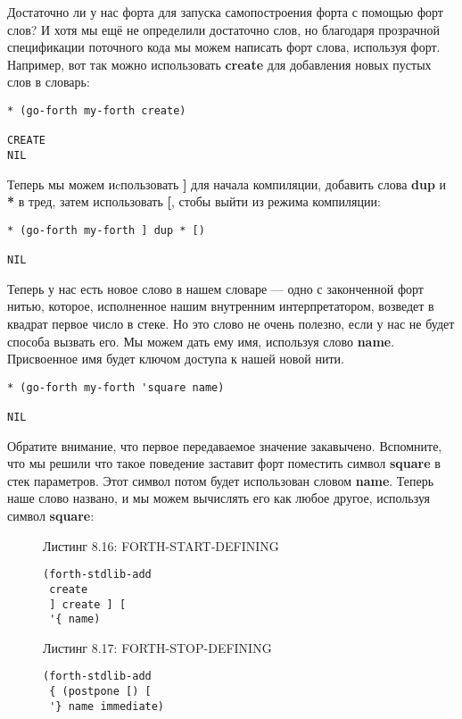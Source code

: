 Достаточно ли у нас форта для запуска самопостроения форта с помощью форт слов? И хотя мы ещё не определили достаточно слов, но благодаря прозрачной спецификации поточного кода мы можем написать форт слова, используя форт. Например, вот так можно использовать \textbf{create} для добавления новых пустых слов в словарь:

\begin{verbatim}
* (go-forth my-forth create)

CREATE 
NIL
\end{verbatim}

Теперь мы можем иcпользовать \textbf{]} для начала компиляции, добавить слова \textbf{dup} и \textbf{*} в тред, затем использовать \textbf{[}, стобы выйти из режима компиляции:

\begin{verbatim}
* (go-forth my-forth ] dup * [)

NIL
\end{verbatim}

Теперь у нас есть новое слово в нашем словаре --- одно с законченной форт нитью, которое, исполненное нашим внутренним интерпретатором, возведет в квадрат первое число в стеке. Но это слово не очень полезно, если у нас не будет способа вызвать его. Мы можем дать ему имя, используя слово \textbf{name}. Присвоенное имя будет ключом доступа к нашей новой нити.

\begin{verbatim}
* (go-forth my-forth 'square name)

NIL
\end{verbatim}

Обратите внимание, что первое передаваемое значение закавычено. Вспомните, что мы решили что такое поведение заставит форт поместить символ \textbf{square} в стек параметров. Этот символ потом будет использован словом \textbf{name}. Теперь наше слово названо, и мы можем вычислять его как любое другое, используя символ \textbf{square}: 

\begin{figure}Листинг 8.16: FORTH-START-DEFINING\label{listing_8.16}
\listbegin
\begin{verbatim}
(forth-stdlib-add
 create
 ] create ] [
 '{ name)
\end{verbatim}
\listend
\end{figure}

\begin{figure}Листинг 8.17: FORTH-STOP-DEFINING\label{listing_8.17}
\listbegin
\begin{verbatim}
(forth-stdlib-add
 { (postpone [) [
 '} name immediate)
\end{verbatim}
\listend
\end{figure}

